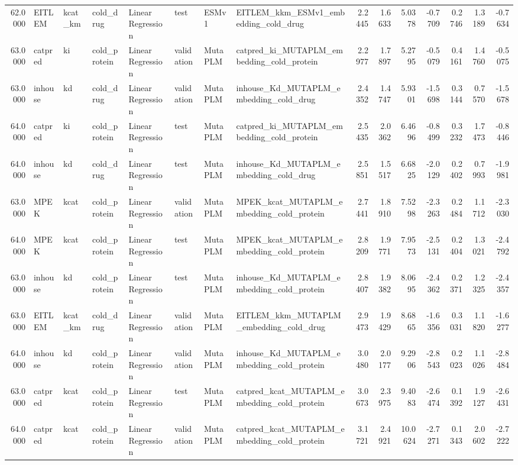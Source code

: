 \begin{tabular}{rlllllllrrrrrrr}
62.0000 & EITLEM & kcat_km & cold_drug & Linear Regression & test & ESMv1 & EITLEM_kkm_ESMv1_embedding_cold_drug & 2.2445 & 1.6633 & 5.0378 & -0.7709 & 0.2746 & 1.3189 & -0.7634 \\
63.0000 & catpred & ki & cold_protein & Linear Regression & validation & MutaPLM & catpred_ki_MUTAPLM_embedding_cold_protein & 2.2977 & 1.7897 & 5.2795 & -0.5079 & 0.4161 & 1.4760 & -0.5075 \\
63.0000 & inhouse & kd & cold_drug & Linear Regression & validation & MutaPLM & inhouse_Kd_MUTAPLM_embedding_cold_drug & 2.4352 & 1.4747 & 5.9301 & -1.5698 & 0.3144 & 0.7570 & -1.5678 \\
64.0000 & catpred & ki & cold_protein & Linear Regression & test & MutaPLM & catpred_ki_MUTAPLM_embedding_cold_protein & 2.5435 & 2.0362 & 6.4696 & -0.8499 & 0.3232 & 1.7473 & -0.8446 \\
64.0000 & inhouse & kd & cold_drug & Linear Regression & test & MutaPLM & inhouse_Kd_MUTAPLM_embedding_cold_drug & 2.5851 & 1.5517 & 6.6825 & -2.0129 & 0.2402 & 0.7993 & -1.9981 \\
63.0000 & MPEK & kcat & cold_protein & Linear Regression & validation & MutaPLM & MPEK_kcat_MUTAPLM_embedding_cold_protein & 2.7441 & 1.8910 & 7.5298 & -2.3263 & 0.2484 & 1.1712 & -2.3030 \\
64.0000 & MPEK & kcat & cold_protein & Linear Regression & test & MutaPLM & MPEK_kcat_MUTAPLM_embedding_cold_protein & 2.8209 & 1.9771 & 7.9573 & -2.5131 & 0.2404 & 1.3021 & -2.4792 \\
63.0000 & inhouse & kd & cold_protein & Linear Regression & test & MutaPLM & inhouse_Kd_MUTAPLM_embedding_cold_protein & 2.8407 & 1.9382 & 8.0695 & -2.4362 & 0.2371 & 1.2325 & -2.4357 \\
63.0000 & EITLEM & kcat_km & cold_drug & Linear Regression & validation & MutaPLM & EITLEM_kkm_MUTAPLM_embedding_cold_drug & 2.9473 & 1.9429 & 8.6865 & -1.6356 & 0.3031 & 1.1820 & -1.6277 \\
64.0000 & inhouse & kd & cold_protein & Linear Regression & validation & MutaPLM & inhouse_Kd_MUTAPLM_embedding_cold_protein & 3.0480 & 2.0177 & 9.2906 & -2.8543 & 0.2023 & 1.1026 & -2.8484 \\
63.0000 & catpred & kcat & cold_protein & Linear Regression & test & MutaPLM & catpred_kcat_MUTAPLM_embedding_cold_protein & 3.0673 & 2.3975 & 9.4083 & -2.6474 & 0.1392 & 1.9127 & -2.6431 \\
64.0000 & catpred & kcat & cold_protein & Linear Regression & validation & MutaPLM & catpred_kcat_MUTAPLM_embedding_cold_protein & 3.1721 & 2.4921 & 10.0624 & -2.7271 & 0.1343 & 2.0602 & -2.7222 \\

\end{tabular}
